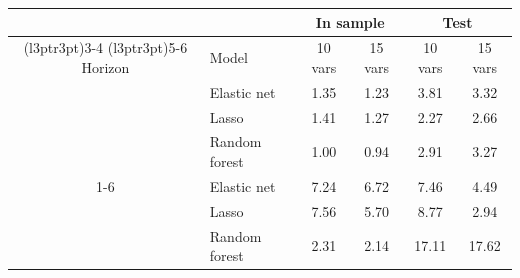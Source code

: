 \begin{tabular}{clcccc}
\toprule
\multicolumn{2}{c}{ } & \multicolumn{2}{c}{In sample} & \multicolumn{2}{c}{Test} \\
\cmidrule(l{3pt}r{3pt}){3-4} \cmidrule(l{3pt}r{3pt}){5-6}
Horizon & Model & 10 vars & 15 vars & 10 vars & 15 vars\\
\midrule
 & Elastic net & 1.35 & 1.23 & 3.81 & 3.32\\

 & Lasso & 1.41 & 1.27 & 2.27 & 2.66\\

\multirow{-3}{*}{\centering\arraybackslash 1} & Random forest & 1.00 & 0.94 & 2.91 & 3.27\\
\cmidrule{1-6}
 & Elastic net & 7.24 & 6.72 & 7.46 & 4.49\\

 & Lasso & 7.56 & 5.70 & 8.77 & 2.94\\

\multirow{-3}{*}{\centering\arraybackslash 6} & Random forest & 2.31 & 2.14 & 17.11 & 17.62\\
\bottomrule
\end{tabular}